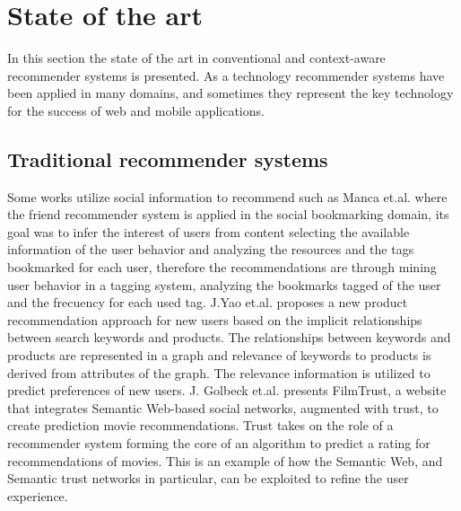 \chapter{State of the art} \label{stateoftheart}
In this section the state of the art in conventional and
context-aware recommender systems is presented. 
As a technology recommender systems have been applied 
in many domains, and sometimes they represent the  key
technology for the success of web and mobile applications.\\  
% 
\section{Traditional recommender systems} 
Some works utilize social information to recommend such
as Manca et.al.\cite{manca2014mining} where the friend recommender
system is applied in the social bookmarking domain, its goal was to
infer the interest of users from content selecting the available
information of the user behavior and analyzing the resources and the
tags bookmarked for each user, therefore the recommendations are
through mining user behavior in a tagging system, analyzing the
bookmarks tagged of the user and the frecuency for each used tag. 
J.Yao et.al.\cite{yao2012product} proposes a new product recommendation
approach for new users based on the implicit relationships between
search keywords and products. The relationships between keywords and
products are represented in a graph and relevance of keywords to
products is derived from attributes of the graph.
The relevance
information is utilized to predict preferences of new users. J.
Golbeck et.al.\cite{golbeck2006filmtrust} presents FilmTrust, a
website that integrates Semantic Web-based social networks, augmented
with trust, to create prediction movie recommendations. Trust takes on
the role of a recommender system forming the core of an algorithm to
predict a rating for recommendations of movies. This is an example of
how the Semantic Web, and Semantic trust networks in particular, can
be exploited to refine the user experience. \\  
